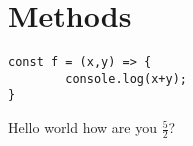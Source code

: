 \chapter{Methods}

\begin{lstlisting}[language=ES6]
const f = (x,y) => {
		console.log(x+y);
}
\end{lstlisting}

Hello world how are you $\frac{5}{2}$?

